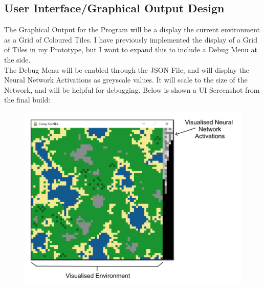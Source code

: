 \begin{flushleft}
        \subsection{User Interface/Graphical Output Design}
            The Graphical Output for the Program will be a display the current environment as a Grid of Coloured Tiles. I have previously
            implemented the display of a Grid of Tiles in my Prototype, but I want to expand this to include a Debug Menu at the side.\\
            \vspace{0.2cm}
            The Debug Menu will be enabled through the JSON File, and will display the Neural Network Activations as greyscale values. 
            It will scale to the size of the Network, and will be helpful for debugging. Below is shown a UI Screenshot from the final
            build: \\

            \begin{figure}[H]
                \centering
                \includegraphics[width=14cm]{Images/Design/AnnotatedUIExample.PNG}
            \end{figure}

\end{flushleft}
